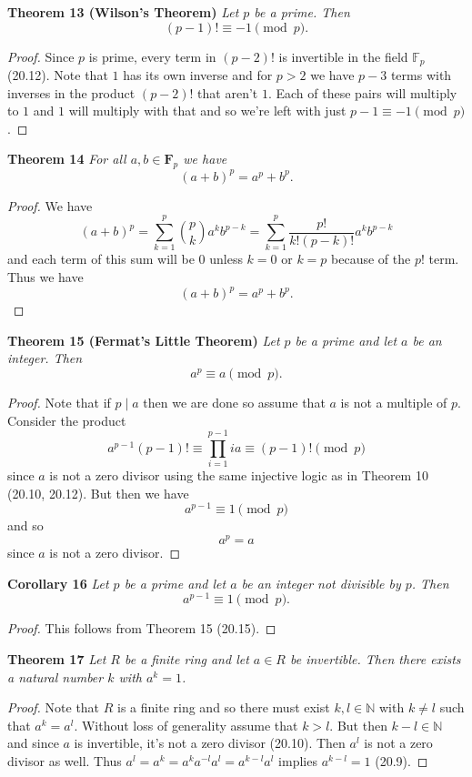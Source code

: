 \documentclass{article}
\begin{document}
\begin{flushleft}
\textbf{Theorem 13 (Wilson's Theorem)}
\textsl{Let $p$ be a prime. Then
\[
(p-1)! \equiv -1 \pmod{p}.
\]}
\begin{proof}
Since $p$ is prime, every term in $(p-2)!$ is invertible in the field $\mathbb{F}_p$ (20.12). Note that $1$ has its own inverse and for $p > 2$ we have $p-3$ terms with inverses in the product $(p-2)!$ that aren't $1$. Each of these pairs will multiply to $1$ and $1$ will multiply with that and so we're left with just $p-1 \equiv -1 \pmod{p}$.
\end{proof}

\textbf{Theorem 14}
\textsl{For all $a,b \in \mathbf{F}_p$ we have
\[
(a+b)^p = a^p+b^p.
\]}
\begin{proof}
We have
\[
(a+b)^p = \sum_{k=1}^p \binom{p}{k} a^k b^{p-k} = \sum_{k=1}^p \frac{p!}{k!(p-k)!} a^k b^{p-k}
\]
and each term of this sum will be $0$ unless $k = 0$ or $k = p$ because of the $p!$ term. Thus we have
\[
(a+b)^p = a^p + b^p.
\]
\end{proof}

\textbf{Theorem 15 (Fermat's Little Theorem)}
\textsl{Let $p$ be a prime and let $a$ be an integer. Then
\[
a^p \equiv a \pmod{p}.
\]}
\begin{proof}
Note that if $p \mid a$ then we are done so assume that $a$ is not a multiple of $p$. Consider the product
\[
a^{p-1} (p-1)! \equiv \prod_{i=1}^{p-1} ia \equiv (p-1)! \pmod{p}
\]
since $a$ is not a zero divisor using the same injective logic as in Theorem 10 (20.10, 20.12). But then we have
\[
a^{p-1} \equiv 1 \pmod {p}
\]
and so
\[
a^p = a
\]
since $a$ is not a zero divisor.
\end{proof}

\textbf{Corollary 16}
\textsl{Let $p$ be a prime and let $a$ be an integer not divisible by $p$. Then
\[
a^{p-1} \equiv 1 \pmod{p}.
\]}
\begin{proof}
This follows from Theorem 15 (20.15).
\end{proof}

\textbf{Theorem 17}
\textsl{Let $R$ be a finite ring and let $a \in R$ be invertible. Then there exists a natural number $k$ with $a^k = 1$.}
\begin{proof}
Note that $R$ is a finite ring and so there must exist $k,l \in \mathbb{N}$ with $k \neq l$ such that $a^k = a^l$. Without loss of generality assume that $k > l$. But then $k-l \in \mathbb{N}$ and since $a$ is invertible, it's not a zero divisor (20.10). Then $a^l$ is not a zero divisor as well. Thus $a^l = a^k = a^k a^{-l} a^l = a^{k-l} a^l$ implies $a^{k-l} = 1$ (20.9).
\end{proof}


\end{flushleft}
\end{document}
